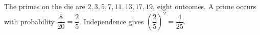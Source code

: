 The primes on the die are $2,3,5,7,11,13,17,19$, eight outcomes. A prime occurs with probability $\dfrac{8}{20}=\dfrac{2}{5}$. Independence gives $(\dfrac{2}{5})^2=\boxed{\dfrac{4}{25}}$.
